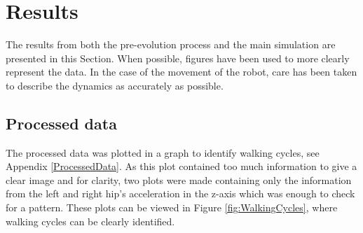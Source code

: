 \section{Results}
The results from both the pre-evolution process and the main simulation are presented in this Section. When possible, figures have been used to more clearly represent the data. In the case of the movement of the robot, care has been taken to describe the dynamics as accurately as possible.

\subsection{Processed data}
The processed data was plotted in a graph to identify walking cycles, see Appendix \ref{ProcessedData}. As this plot contained too much information to give a clear image and for clarity, two plots were made containing only the information from the left and right hip's acceleration in the z-axis which was enough to check for a pattern. These plots can be viewed in Figure \ref{fig:WalkingCycles}, where walking cycles can be clearly identified.


